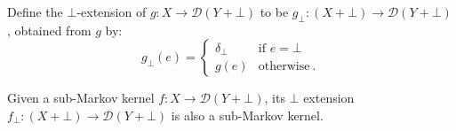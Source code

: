 \begin{definition}\label{def:bot-extension}
	Define the $\bot$-extension of $g : X \to \mathcal{D}(Y + \bot)$ to be $g_{\bot} \colon (X + \bot) \to \mathcal{D}(Y + \bot)$, obtained from $g$ by:
	\[
	g_\bot(e) =
	\begin{cases}
		\delta_\bot & \text{if } e =\bot \\
		g(e) & \text{otherwise}~.
	\end{cases}
	\]
\end{definition}

\begin{lemma}\label{lem:bot-extension-kernel}
	Given a sub-Markov kernel $f : X \to \mathcal{D}(Y + \bot)$, its $\bot$ extension $f_{\bot} : (X + \bot) \to \mathcal{D}(Y + \bot)$ is also a sub-Markov kernel.
\end{lemma}
	
